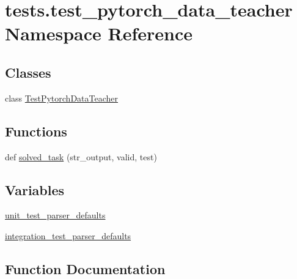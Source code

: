 \hypertarget{namespacetests_1_1test__pytorch__data__teacher}{}\section{tests.\+test\+\_\+pytorch\+\_\+data\+\_\+teacher Namespace Reference}
\label{namespacetests_1_1test__pytorch__data__teacher}
\subsection*{Classes}
\begin{DoxyCompactItemize}
\item 
class \hyperlink{classtests_1_1test__pytorch__data__teacher_1_1TestPytorchDataTeacher}{Test\+Pytorch\+Data\+Teacher}
\end{DoxyCompactItemize}
\subsection*{Functions}
\begin{DoxyCompactItemize}
\item 
def \hyperlink{namespacetests_1_1test__pytorch__data__teacher_a5511223c74b5eca00f42d68488ea101e}{solved\+\_\+task} (str\+\_\+output, valid, test)
\end{DoxyCompactItemize}
\subsection*{Variables}
\begin{DoxyCompactItemize}
\item 
\hyperlink{namespacetests_1_1test__pytorch__data__teacher_a1fda55da67f62f4f91eb27956c7c3e34}{unit\+\_\+test\+\_\+parser\+\_\+defaults}
\item 
\hyperlink{namespacetests_1_1test__pytorch__data__teacher_a59a58faba6f0e5a612f333fd67c5611c}{integration\+\_\+test\+\_\+parser\+\_\+defaults}
\end{DoxyCompactItemize}


\subsection{Function Documentation}
\mbox{\label{namespacetests_1_1test__pytorch__data__teacher_a5511223c74b5eca00f42d68488ea101e}} 
